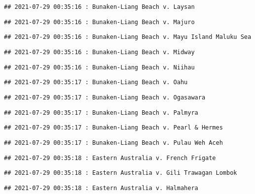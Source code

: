 \documentclass[
]{article}
\begin{document}
\begin{verbatim}
## 2021-07-29 00:35:16 : Bunaken-Liang Beach v. Laysan
\end{verbatim}

\begin{verbatim}
## 2021-07-29 00:35:16 : Bunaken-Liang Beach v. Majuro
\end{verbatim}

\begin{verbatim}
## 2021-07-29 00:35:16 : Bunaken-Liang Beach v. Mayu Island Maluku Sea
\end{verbatim}

\begin{verbatim}
## 2021-07-29 00:35:16 : Bunaken-Liang Beach v. Midway
\end{verbatim}

\begin{verbatim}
## 2021-07-29 00:35:16 : Bunaken-Liang Beach v. Niihau
\end{verbatim}

\begin{verbatim}
## 2021-07-29 00:35:17 : Bunaken-Liang Beach v. Oahu
\end{verbatim}

\begin{verbatim}
## 2021-07-29 00:35:17 : Bunaken-Liang Beach v. Ogasawara
\end{verbatim}

\begin{verbatim}
## 2021-07-29 00:35:17 : Bunaken-Liang Beach v. Palmyra
\end{verbatim}

\begin{verbatim}
## 2021-07-29 00:35:17 : Bunaken-Liang Beach v. Pearl & Hermes
\end{verbatim}

\begin{verbatim}
## 2021-07-29 00:35:17 : Bunaken-Liang Beach v. Pulau Weh Aceh
\end{verbatim}

\begin{verbatim}
## 2021-07-29 00:35:18 : Eastern Australia v. French Frigate
\end{verbatim}

\begin{verbatim}
## 2021-07-29 00:35:18 : Eastern Australia v. Gili Trawagan Lombok
\end{verbatim}

\begin{verbatim}
## 2021-07-29 00:35:18 : Eastern Australia v. Halmahera
\end{verbatim}
\end{document}
